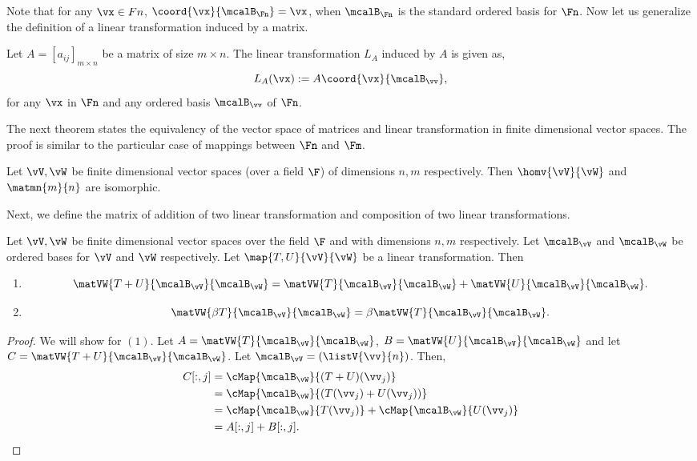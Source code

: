 Note that for any $\vx \in Fn$, $\coord{\vx}{\mcalB_{\Fn}} = \vx$, when $\mcalB_{\Fn}$ is the standard ordered
basis for $\Fn$. Now let us generalize the definition of a linear transformation induced by a matrix.

\begin{Definition}
    Let $A = {[a_{ij}]}_{m\times n}$ be a matrix of size $m\times n$. The linear transformation
    $L_{A}$ induced by $A$ is given as,
    \[L_{A}(\vx) := A\coord{\vx}{\mcalB_{\vv}},\]
    for any $\vx$ in $\Fn$ and any ordered basis $\mcalB_{\vv}$ of $\Fn$.
\end{Definition}
The next theorem states the equivalency of the vector space of matrices and linear transformation in finite
dimensional vector spaces. The proof is similar to the particular case of mappings between $\Fn$ and $\Fm$.
\begin{Theorem}
    Let $\vV,\vW$ be finite dimensional vector spaces (over a field $\F$) 
    of dimensions $n,m$ respectively. Then $\homv{\vV}{\vW}$
    and $\matmn{m}{n}$ are isomorphic.
\end{Theorem}
Next, we define the matrix of addition of two linear transformation and composition of two linear
transformations.
\begin{Theorem}
    Let $\vV,\vW$ be finite dimensional vector spaces over the field $\F$ and with dimensions $n,m$
    respectively. Let $\mcalB_{\vV}$ and $\mcalB_{\vW}$ be ordered bases for $\vV$ and $\vW$ respectively. Let
    $\map{T,U}{\vV}{\vW}$ be a linear transformation. Then
    \begin{enumerate}
	\item
	    \[\matVW{T + U}{\mcalB_{\vV}}{\mcalB_{\vW}} = 
		\matVW{T}{\mcalB_{\vV}}{\mcalB_{\vW}} + \matVW{U}{\mcalB_{\vV}}{\mcalB_{\vW}}.\] 
	\item
	    \[\matVW{\beta T}{\mcalB_{\vV}}{\mcalB_{\vW}} = \beta\matVW{T}{\mcalB_{\vV}}{\mcalB_{\vW}}.\]
    \end{enumerate}
\end{Theorem}
\begin{proof}
    We will show for $(1)$.
    Let $A = \matVW{T}{\mcalB_{\vV}}{\mcalB_{\vW}}$, $B = \matVW{U}{\mcalB_{\vV}}{\mcalB_{\vW}}$ and let 
    $C = \matVW{T + U}{\mcalB_{\vV}}{\mcalB_{\vW}}$.
    Let $\mcalB_{\vV} = \left(\listV{\vv}{n}\right)$. Then,
    \begin{align*}
	C[:,j] &= \cMap{\mcalB_{\vW}}{(T+U)(\vv_{j})}\\
	& = \cMap{\mcalB_{\vW}}{\left(T(\vv_{j}) + U(\vv_{j})\right)}\\
	& = \cMap{\mcalB_{\vW}}{T(\vv_j)} + \cMap{\mcalB_{\vW}}{U(\vv_j)}\\
	& = A[:,j] + B[:,j].
    \end{align*}
\end{proof}
